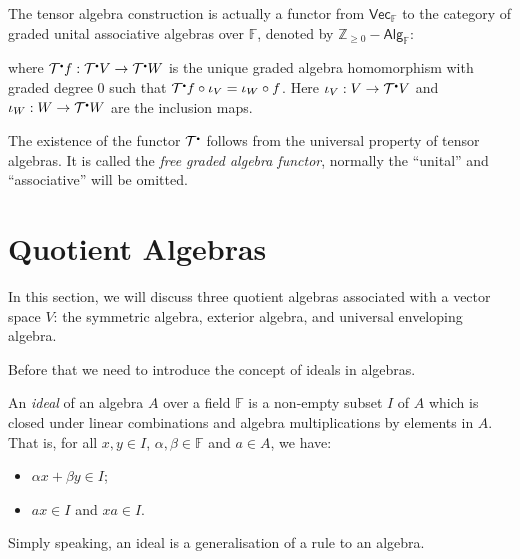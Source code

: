 \documentclass[
	11pt, %
	fleqn, %
	a4paper, %
]{LegrandOrangeBook}
\newcommand{\smallbullet}{\scalebox{0.5}{$\bullet$}}
\newcommand{\F}{\mathbb{F}} %
\newcommand{\Vect}{\boldsymbol{\mathsf{Vec}}} %
\newcommand{\T}{\mathcal{T}^{\smallbullet}} %
\newcommand{\Z}{\mathbb{Z}} %
\newcommand{\Alg}{\boldsymbol{\mathsf{Alg}}} %
\begin{document}
The tensor algebra construction is actually a functor from $\Vect_{\F}$ to the category of graded unital associative algebras over $\F$, denoted by $\Z_{\geq 0} - \Alg_{\F}$:
\begin{center}
\end{center}
where $\T f : \T V \to \T W$ is the unique graded algebra homomorphism with graded degree $0$ such that $\T f \circ \iota_V = \iota_W \circ f$. Here $\iota_V : V \to \T V$ and $\iota_W : W \to \T W$ are the inclusion maps. 

The existence of the functor $\T$ follows from the universal property of tensor algebras. It is called the \emph{free graded algebra functor}, normally the ``unital'' and ``associative'' will be omitted.

\newpage

\section{Quotient Algebras}

In this section, we will discuss three quotient algebras associated with a vector space $V$: the symmetric algebra, exterior algebra, and universal enveloping algebra.

Before that we need to introduce the concept of ideals in algebras.

\begin{definition}
    An \emph{ideal} of an algebra $A$ over a field $\F$ is a non-empty subset $I$ of $A$ which is closed under linear combinations and algebra multiplications by elements in $A$. That is, for all $x, y \in I$, $\alpha, \beta \in \F$ and $a \in A$, we have:
    \begin{itemize}
        \item $\alpha x + \beta y \in I$;
        \item $ax \in I$ and $xa \in I$.
    \end{itemize}
\end{definition}

Simply speaking, an ideal is a generalisation of a rule to an algebra.
\end{document}
